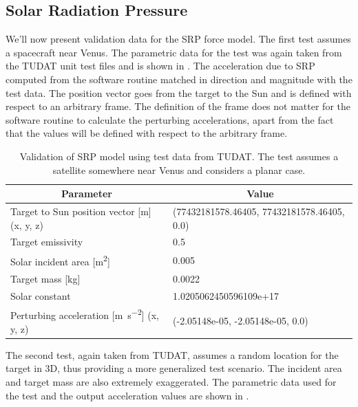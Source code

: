 \subsection{Solar Radiation Pressure}
\label{subsec:srp_vv}
We'll now present validation data for the \gls{SRP} force model. The first test assumes a spacecraft near Venus. The parametric data for the test was again taken from the \gls{TUDAT} unit test files and is shown in . The acceleration due to \gls{SRP} computed from the software routine matched in direction and magnitude with the test data. The position vector goes from the target to the Sun and is defined with respect to an arbitrary frame. The definition of the frame does not matter for the software routine to calculate the perturbing accelerations, apart from the fact that the values will be defined with respect to the arbitrary frame.
\begin{table}[htb]
\centering
\captionsetup{justification=centering}
\caption{Validation of \gls{SRP} model using test data from \gls{TUDAT}. The test assumes a satellite somewhere near Venus and considers a planar case.}
\label{tab:srp_vv_tudat_data_1}
\begin{tabular}{|l|l|}
\hline
\multicolumn{1}{|c|}{\textbf{Parameter}} & \multicolumn{1}{c|}{\textbf{Value}} \\ \hline
Target to Sun position vector {[}m{]} (x, y, z) & (77432181578.46405, 77432181578.46405, 0.0) \\ \hline
Target emissivity & 0.5 \\ \hline
Solar incident area {[}\si{\metre \squared}{]} & 0.005 \\ \hline
Target mass {[}kg{]} & 0.0022 \\ \hline
Solar constant & 1.0205062450596109e+17 \\ \hline
Perturbing acceleration {[}\si{\metre \per \second \squared}{]} (x, y, z) & (-2.05148e-05, -2.05148e-05, 0.0) \\ \hline
\end{tabular}
\end{table}
\FloatBarrier
The second test, again taken from \gls{TUDAT}, assumes a random location for the target in 3D, thus providing a more generalized test scenario. The incident area and target mass are also extremely exaggerated. The parametric data used for the test and the output acceleration values are shown in .
